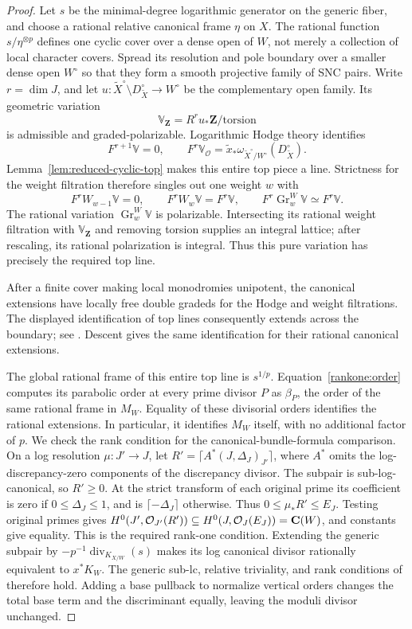 \begin{proof}
Let $s$ be the minimal-degree logarithmic generator on the generic
fiber, and choose a rational relative canonical frame $\eta$ on
$X$. The rational function $s/\eta^{\otimes p}$ defines one
cyclic cover over a dense open of $W$, not merely a collection
of local character covers. Spread its resolution and pole boundary
over a smaller dense open $W^\circ$ so that they form a smooth
projective family of SNC pairs. Write $r=\dim J$, and let
$u:\widetilde X^\circ\setminus D_{\widetilde X}^\circ\to W^\circ$
be the complementary open family. Its geometric variation
\[
 \mathbb V_{\mathbf Z}=R^ru_*\mathbf Z/\mathrm{torsion}
\]
is admissible and graded-polarizable. Logarithmic Hodge theory
identifies
\[
 F^{r+1}\mathbb V=0,\qquad
 F^r\mathbb V_{\mathcal O}
   =\widetilde x_*\omega_{\widetilde X^\circ/W^\circ}
                           (D_{\widetilde X}^\circ).
\]
Lemma~\ref{lem:reduced-cyclic-top} makes this entire top piece a
line. Strictness for the weight filtration therefore singles out
one weight $w$ with
\[
 F^rW_{w-1}\mathbb V=0,
 \qquad F^rW_w\mathbb V=F^r\mathbb V,
 \qquad
 F^r\operatorname{Gr}^W_w\mathbb V\simeq F^r\mathbb V.
\]
The rational variation $\operatorname{Gr}^W_w\mathbb V$ is
polarizable. Intersecting its rational weight filtration with
$\mathbb V_{\mathbf Z}$ and removing torsion supplies an integral
lattice; after rescaling, its rational polarization is integral.
Thus this pure variation has precisely the required top line.

After a finite cover making local monodromies unipotent, the
canonical extensions have locally free double gradeds for the
Hodge and weight filtrations. The displayed identification of top
lines consequently extends across the boundary; see
\cite[Proposition~3.12]{FujinoFujisawa}. Descent gives the same
identification for their rational canonical extensions.

The global rational frame of this entire top line is
$s^{1/p}$. Equation~\eqref{rankone:order} computes its parabolic
order at every prime divisor $P$ as $\beta_P$, the order of the
same rational frame in $M_W$. Equality of these divisorial
orders identifies the rational extensions. In particular, it
identifies $M_W$ itself, with no additional factor of $p$.
We check the rank condition for the canonical-bundle-formula
comparison. On a log resolution $\mu:J'\to J$, let
$R'=\lceil A^*(J,\Delta_J)_{J'}\rceil$, where $A^*$ omits the
log-discrepancy-zero components of the discrepancy divisor.
The subpair is sub-log-canonical, so $R'\geq0$. At the strict
transform of each original prime its coefficient is zero if
$0\leq\Delta_J\leq1$, and is $\lceil-\Delta_J\rceil$ otherwise.
Thus $0\leq\mu_*R'\leq E_J$. Testing original primes gives
$H^0(J',\mathcal O_{J'}(R'))\subseteq H^0(J,\mathcal O_J(E_J))=\mathbf C(W)$,
and constants give equality. This is the required rank-one condition.
Extending the generic subpair by
$-p^{-1}\operatorname{div}_{K_{X/W}}(s)$ makes its log canonical
divisor rationally equivalent to $x^*K_W$. The generic sub-lc,
relative triviality, and rank conditions of
\cite[Definition~6.18]{BFMT} therefore hold. Adding a base pullback
to normalize vertical orders changes the total base term and the
discriminant equally, leaving the moduli divisor unchanged.


\end{proof}
